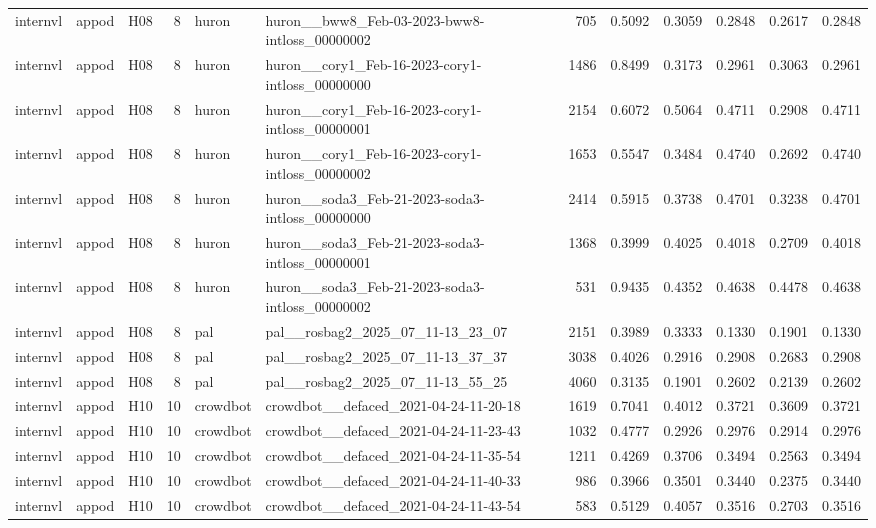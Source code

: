 \begin{table}[tbp]
\begin{tabular}{lllrllrrrrrr}
internvl & appod & H08 & 8 & huron & huron\_\_bww8\_Feb-03-2023-bww8-intloss\_00000002 & 705 & 0.5092 & 0.3059 & 0.2848 & 0.2617 & 0.2848 \\
internvl & appod & H08 & 8 & huron & huron\_\_cory1\_Feb-16-2023-cory1-intloss\_00000000 & 1486 & 0.8499 & 0.3173 & 0.2961 & 0.3063 & 0.2961 \\
internvl & appod & H08 & 8 & huron & huron\_\_cory1\_Feb-16-2023-cory1-intloss\_00000001 & 2154 & 0.6072 & 0.5064 & 0.4711 & 0.2908 & 0.4711 \\
internvl & appod & H08 & 8 & huron & huron\_\_cory1\_Feb-16-2023-cory1-intloss\_00000002 & 1653 & 0.5547 & 0.3484 & 0.4740 & 0.2692 & 0.4740 \\
internvl & appod & H08 & 8 & huron & huron\_\_soda3\_Feb-21-2023-soda3-intloss\_00000000 & 2414 & 0.5915 & 0.3738 & 0.4701 & 0.3238 & 0.4701 \\
internvl & appod & H08 & 8 & huron & huron\_\_soda3\_Feb-21-2023-soda3-intloss\_00000001 & 1368 & 0.3999 & 0.4025 & 0.4018 & 0.2709 & 0.4018 \\
internvl & appod & H08 & 8 & huron & huron\_\_soda3\_Feb-21-2023-soda3-intloss\_00000002 & 531 & 0.9435 & 0.4352 & 0.4638 & 0.4478 & 0.4638 \\
internvl & appod & H08 & 8 & pal & pal\_\_rosbag2\_2025\_07\_11-13\_23\_07 & 2151 & 0.3989 & 0.3333 & 0.1330 & 0.1901 & 0.1330 \\
internvl & appod & H08 & 8 & pal & pal\_\_rosbag2\_2025\_07\_11-13\_37\_37 & 3038 & 0.4026 & 0.2916 & 0.2908 & 0.2683 & 0.2908 \\
internvl & appod & H08 & 8 & pal & pal\_\_rosbag2\_2025\_07\_11-13\_55\_25 & 4060 & 0.3135 & 0.1901 & 0.2602 & 0.2139 & 0.2602 \\
internvl & appod & H10 & 10 & crowdbot & crowdbot\_\_defaced\_2021-04-24-11-20-18 & 1619 & 0.7041 & 0.4012 & 0.3721 & 0.3609 & 0.3721 \\
internvl & appod & H10 & 10 & crowdbot & crowdbot\_\_defaced\_2021-04-24-11-23-43 & 1032 & 0.4777 & 0.2926 & 0.2976 & 0.2914 & 0.2976 \\
internvl & appod & H10 & 10 & crowdbot & crowdbot\_\_defaced\_2021-04-24-11-35-54 & 1211 & 0.4269 & 0.3706 & 0.3494 & 0.2563 & 0.3494 \\
internvl & appod & H10 & 10 & crowdbot & crowdbot\_\_defaced\_2021-04-24-11-40-33 & 986 & 0.3966 & 0.3501 & 0.3440 & 0.2375 & 0.3440 \\
internvl & appod & H10 & 10 & crowdbot & crowdbot\_\_defaced\_2021-04-24-11-43-54 & 583 & 0.5129 & 0.4057 & 0.3516 & 0.2703 & 0.3516 \\

\end{tabular}
\end{table}
